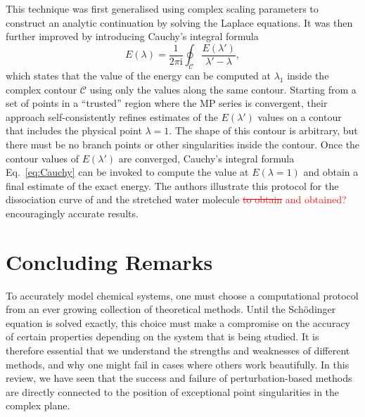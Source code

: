 \documentclass[aps,prb,reprint,noshowkeys,superscriptaddress]{revtex4-1}
\newcommand{\titou}[1]{\textcolor{red}{#1}}
\newcommand{\trash}[1]{\textcolor{red}{\sout{#1}}}
\renewcommand{\i}{\mathrm{i}} %
\begin{document}
This technique was first generalised using complex scaling parameters to construct an analytic
continuation by solving the Laplace equations.\cite{Surjan_2018}
It was then further improved by introducing Cauchy's integral formula\cite{Mihalka_2019}
\begin{equation}
	\label{eq:Cauchy}
    E(\lambda) = \frac{1}{2\pi \i} \oint_{\mathcal{C}} \frac{E(\lambda')}{\lambda' - \lambda},
\end{equation}
which states that the value of the energy can be computed at $\lambda_1$ inside the complex 
contour $\mathcal{C}$ using only the values along the same contour.
Starting from a set of points in a ``trusted'' region where the MP series is convergent, their approach 
self-consistently refines estimates of the $E(\lambda')$ values on a contour that includes the physical point 
$\lambda = 1$.
The shape of this contour is arbitrary, but there must be no branch points or other singularities inside
the contour.
Once the contour values of $E(\lambda')$ are converged, Cauchy's integral formula Eq.~\eqref{eq:Cauchy} can 
be invoked to compute the value at $E(\lambda=1)$ and obtain a final estimate of the exact energy.
The authors illustrate this protocol for the dissociation curve of  and the stretched water 
molecule \trash{to obtain} \titou{and obtained?} encouragingly accurate results.\cite{Mihalka_2019} 

\section{Concluding Remarks}
\label{sec:ccl}

To accurately model chemical systems, one must choose a computational protocol from an ever growing 
collection of theoretical methods.
Until the Sch\"odinger equation is solved exactly, this choice must make a compromise on the accuracy
of certain properties depending on the system that is being studied.
It is therefore essential that we understand the strengths and weaknesses of different methods, 
and why one might fail in cases where others work beautifully.
In this review, we have seen that the success and failure of perturbation-based methods are 
directly connected to the position of exceptional point singularities in the complex plane.
\end{document}
